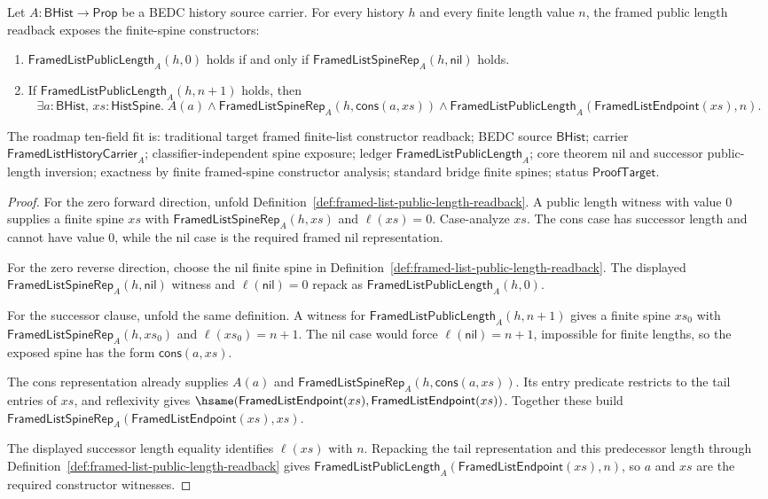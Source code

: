 \begin{theorem}
\label{thm:framed-list-public-length-constructor-readback}
Let $A:\mathsf{BHist}\to\mathsf{Prop}$ be a BEDC history source carrier. For
every history $h$ and every finite length value $n$, the framed public length
readback exposes the finite-spine constructors:
\begin{enumerate}
  \item $\mathsf{FramedListPublicLength}_A(h,0)$ holds if and only if
  $\mathsf{FramedListSpineRep}_A(h,\mathsf{nil})$ holds.
  \item If $\mathsf{FramedListPublicLength}_A(h,n+1)$ holds, then
  $$
  \exists a:\mathsf{BHist},\,xs:\mathsf{HistSpine}.\;
  A(a)\land
  \mathsf{FramedListSpineRep}_A(h,\mathsf{cons}(a,xs))\land
  \mathsf{FramedListPublicLength}_A(\mathsf{FramedListEndpoint}(xs),n).
  $$
\end{enumerate}
The roadmap ten-field fit is: traditional target framed finite-list constructor
readback; BEDC source $\mathsf{BHist}$; carrier
$\mathsf{FramedListHistoryCarrier}_A$; classifier-independent spine exposure;
ledger $\mathsf{FramedListPublicLength}_A$; core theorem nil and successor
public-length inversion; exactness by finite framed-spine constructor analysis;
standard bridge finite spines; status $\mathsf{ProofTarget}$.
\end{theorem}
\begin{proof}
For the zero forward direction, unfold
Definition~\ref{def:framed-list-public-length-readback}. A public length witness
with value $0$ supplies a finite spine $xs$ with
$\mathsf{FramedListSpineRep}_A(h,xs)$ and $\ell(xs)=0$. Case-analyze $xs$. The
cons case has successor length and cannot have value $0$, while the nil case is
the required framed nil representation.

For the zero reverse direction, choose the nil finite spine in
Definition~\ref{def:framed-list-public-length-readback}. The displayed
$\mathsf{FramedListSpineRep}_A(h,\mathsf{nil})$ witness and
$\ell(\mathsf{nil})=0$ repack as
$\mathsf{FramedListPublicLength}_A(h,0)$.

For the successor clause, unfold the same definition. A witness for
$\mathsf{FramedListPublicLength}_A(h,n+1)$ gives a finite spine $xs_0$ with
$\mathsf{FramedListSpineRep}_A(h,xs_0)$ and $\ell(xs_0)=n+1$. The nil case would
force $\ell(\mathsf{nil})=n+1$, impossible for finite lengths, so the exposed
spine has the form $\mathsf{cons}(a,xs)$.

The cons representation already supplies $A(a)$ and
$\mathsf{FramedListSpineRep}_A(h,\mathsf{cons}(a,xs))$. Its entry predicate
restricts to the tail entries of $xs$, and reflexivity gives
$\hsame(\mathsf{FramedListEndpoint}(xs),\mathsf{FramedListEndpoint}(xs))$.
Together these build
$\mathsf{FramedListSpineRep}_A(\mathsf{FramedListEndpoint}(xs),xs)$.

The displayed successor length equality identifies $\ell(xs)$ with $n$.
Repacking the tail representation and this predecessor length through
Definition~\ref{def:framed-list-public-length-readback} gives
$\mathsf{FramedListPublicLength}_A(\mathsf{FramedListEndpoint}(xs),n)$, so $a$
and $xs$ are the required constructor witnesses.
\end{proof}
